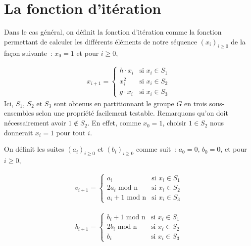         \section{La fonction d'itération}
        Dans le cas général, on définit la fonction d'itération comme la fonction permettant de calculer les différents éléments de notre séquence $(x_i)_{i \ge 0}$ de la façon suivante~: $x_0 = 1$ et pour $i \geq 0$,

        \begin{align*}
          x_{i+1} =
          \begin{cases}
            h \cdot x_i & \text{si } x_i \in S_1 \\
            x_i^2 & \text{si } x_i \in S_2 \\
            g \cdot x_i & \text{si } x_i \in S_3
          \end{cases}
        \end{align*}
        Ici, $S_1$, $S_2$ et $S_3$ sont obtenus en partitionnant le groupe $G$ en trois sous-ensembles selon une propriété facilement testable. Remarquons qu'on doit nécessairement avoir $1 \notin S_2$. En effet, comme $x_0 = 1$, choisir $1 \in S_2$ nous donnerait $x_i = 1$ pour tout $i$.
		
        On définit les suites ${(a_i)}_{i \geq 0}$ et ${(b_i)}_{i \geq 0}$ comme suit~: $a_0 = 0$, $b_0 = 0$, et pour $i \geq 0$,

        \begin{align*}
          a_{i+1} =
          \begin{cases}
            a_i                   & \text{si } x_i \in S_1 \\
            2a_i \text{\ mod n}    & \text{si } x_i \in S_2 \\
            a_i + 1 \text{\ mod n} & \text{si } x_i \in S_3
          \end{cases}
        \end{align*}

        \begin{align*}
          b_{i+1} =
          \begin{cases}
            b_i + 1 \text{\ mod n} & \text{si } x_i \in S_1 \\
            2b_i \text{\ mod n}    & \text{si } x_i \in S_2 \\
            b_i                   & \text{si } x_i \in S_3
          \end{cases}
        \end{align*}

